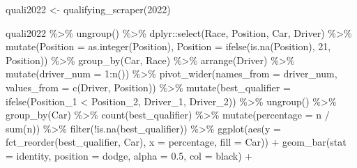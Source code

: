\documentclass[
]{book}
\newenvironment{Shaded}{\begin{snugshade}}{\end{snugshade}}
\newcommand{\AttributeTok}[1]{\textcolor[rgb]{0.77,0.63,0.00}{#1}}
\newcommand{\DecValTok}[1]{\textcolor[rgb]{0.00,0.00,0.81}{#1}}
\newcommand{\FloatTok}[1]{\textcolor[rgb]{0.00,0.00,0.81}{#1}}
\newcommand{\FunctionTok}[1]{\textcolor[rgb]{0.00,0.00,0.00}{#1}}
\newcommand{\NormalTok}[1]{#1}
\newcommand{\OtherTok}[1]{\textcolor[rgb]{0.56,0.35,0.01}{#1}}
\newcommand{\SpecialCharTok}[1]{\textcolor[rgb]{0.00,0.00,0.00}{#1}}
\newcommand{\StringTok}[1]{\textcolor[rgb]{0.31,0.60,0.02}{#1}}
\begin{document}
\begin{Shaded}
\begin{Highlighting}[]
\NormalTok{quali2022 }\OtherTok{\textless{}{-}} \FunctionTok{qualifying\_scraper}\NormalTok{(}\DecValTok{2022}\NormalTok{)}

\NormalTok{quali2022 }\SpecialCharTok{\%\textgreater{}\%}
  \FunctionTok{ungroup}\NormalTok{() }\SpecialCharTok{\%\textgreater{}\%}
\NormalTok{  dplyr}\SpecialCharTok{::}\FunctionTok{select}\NormalTok{(Race, Position, Car, Driver) }\SpecialCharTok{\%\textgreater{}\%}
  \FunctionTok{mutate}\NormalTok{(}\AttributeTok{Position =} \FunctionTok{as.integer}\NormalTok{(Position),}
         \AttributeTok{Position =} \FunctionTok{ifelse}\NormalTok{(}\FunctionTok{is.na}\NormalTok{(Position), }\DecValTok{21}\NormalTok{, Position)) }\SpecialCharTok{\%\textgreater{}\%} 
  \FunctionTok{group\_by}\NormalTok{(Car, Race) }\SpecialCharTok{\%\textgreater{}\%} 
  \FunctionTok{arrange}\NormalTok{(Driver) }\SpecialCharTok{\%\textgreater{}\%} 
  \FunctionTok{mutate}\NormalTok{(}\AttributeTok{driver\_num =} \DecValTok{1}\SpecialCharTok{:}\FunctionTok{n}\NormalTok{()) }\SpecialCharTok{\%\textgreater{}\%} 
  \FunctionTok{pivot\_wider}\NormalTok{(}\AttributeTok{names\_from =} \StringTok{\textquotesingle{}driver\_num\textquotesingle{}}\NormalTok{, }\AttributeTok{values\_from =} \FunctionTok{c}\NormalTok{(}\StringTok{\textquotesingle{}Driver\textquotesingle{}}\NormalTok{, }\StringTok{\textquotesingle{}Position\textquotesingle{}}\NormalTok{)) }\SpecialCharTok{\%\textgreater{}\%}
  \FunctionTok{mutate}\NormalTok{(}\AttributeTok{best\_qualifier =} \FunctionTok{ifelse}\NormalTok{(Position\_1 }\SpecialCharTok{\textless{}}\NormalTok{ Position\_2, Driver\_1, Driver\_2)) }\SpecialCharTok{\%\textgreater{}\%}
  \FunctionTok{ungroup}\NormalTok{() }\SpecialCharTok{\%\textgreater{}\%}
  \FunctionTok{group\_by}\NormalTok{(Car) }\SpecialCharTok{\%\textgreater{}\%}
  \FunctionTok{count}\NormalTok{(best\_qualifier) }\SpecialCharTok{\%\textgreater{}\%}
  \FunctionTok{mutate}\NormalTok{(}\AttributeTok{percentage =}\NormalTok{ n }\SpecialCharTok{/} \FunctionTok{sum}\NormalTok{(n)) }\SpecialCharTok{\%\textgreater{}\%}
  \FunctionTok{filter}\NormalTok{(}\SpecialCharTok{!}\FunctionTok{is.na}\NormalTok{(best\_qualifier)) }\SpecialCharTok{\%\textgreater{}\%}  
  \FunctionTok{ggplot}\NormalTok{(}\FunctionTok{aes}\NormalTok{(}\AttributeTok{y =} \FunctionTok{fct\_reorder}\NormalTok{(best\_qualifier, Car), }\AttributeTok{x =}\NormalTok{ percentage, }\AttributeTok{fill =}\NormalTok{ Car)) }\SpecialCharTok{+}
  \FunctionTok{geom\_bar}\NormalTok{(}\AttributeTok{stat =} \StringTok{\textquotesingle{}identity\textquotesingle{}}\NormalTok{, }\AttributeTok{position =} \StringTok{\textquotesingle{}dodge\textquotesingle{}}\NormalTok{, }\AttributeTok{alpha =} \FloatTok{0.5}\NormalTok{, }\AttributeTok{col =} \StringTok{\textquotesingle{}black\textquotesingle{}}\NormalTok{) }\SpecialCharTok{+}

\end{Highlighting}
\end{Shaded}
\end{document}
